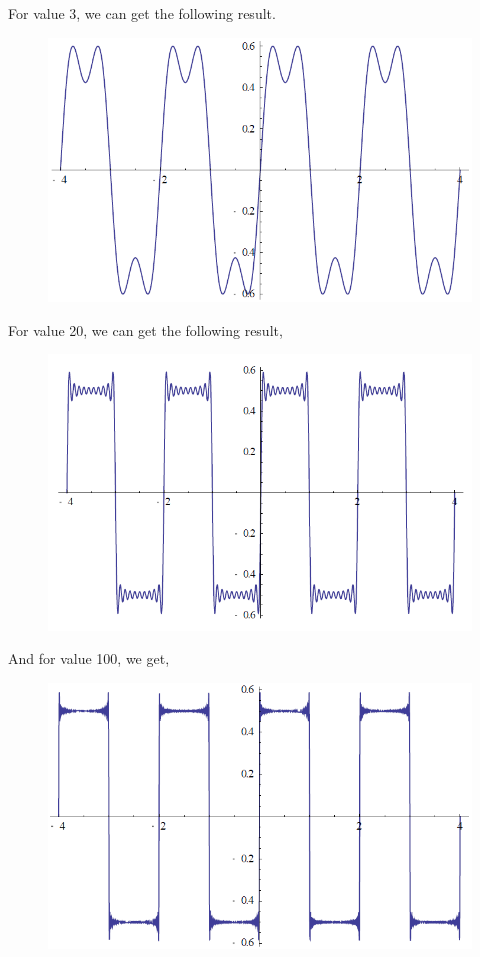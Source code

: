 \documentclass[a4paper]{report}
\begin{document}
For value 3, we can get the following result.
\begin{figure}[H]
	\centering
	\includegraphics[width=1\linewidth]{4.png}
\end{figure}
For value 20, we can get the following result,
\begin{figure}[H]
	\centering
	\includegraphics[width=1\linewidth]{5.png}
\end{figure}
And for value 100, we get,
\begin{figure}[H]
	\centering
	\includegraphics[width=1\linewidth]{6.png}
\end{figure}
\end{document}
